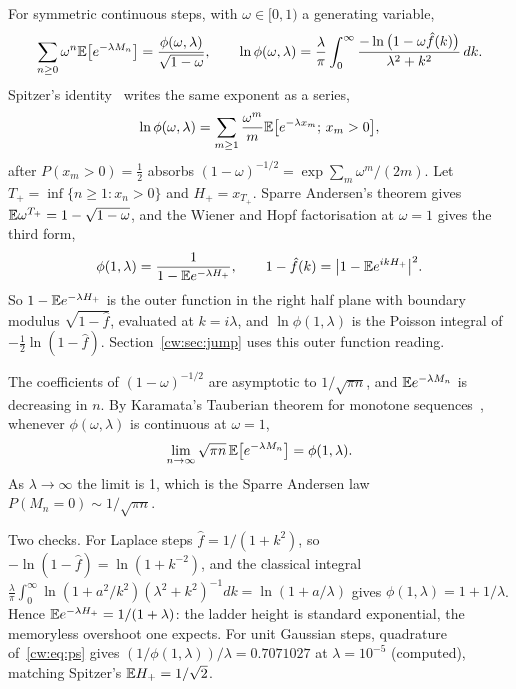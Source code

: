 For symmetric continuous steps, with $\omega\in[0,1)$ a generating variable,
\begin{equation}\label{cw:eq:ps}
\sum_{n\ge0}\omega^n\mathbb{E}\big[e^{-\lambda M_n}\big]=\frac{\phi(\omega,\lambda)}{\sqrt{1-\omega}},\qquad
\ln\phi(\omega,\lambda)=\frac\lambda\pi\int_0^\infty\frac{-\ln\big(1-\omega\hat f(k)\big)}{\lambda^2+k^2}\,dk .
\end{equation}
Spitzer's identity~\cite{Spitzer56} writes the same exponent as a series,
\begin{equation}\label{cw:eq:spitzer}
\ln\phi(\omega,\lambda)=\sum_{m\ge1}\frac{\omega^m}{m}\mathbb{E}\big[e^{-\lambda x_m};\,x_m>0\big],
\end{equation}
after $P(x_m>0)=\tfrac12$ absorbs $(1-\omega)^{-1/2}=\exp\sum_m\omega^m/(2m)$. Let $T_+=\inf\{n\ge1:x_n>0\}$ and $H_+=x_{T_+}$. Sparre Andersen's theorem gives $\mathbb{E}\omega^{T_+}=1-\sqrt{1-\omega}$, and the Wiener and Hopf factorisation at $\omega=1$ gives the third form,
\begin{equation}\label{cw:eq:ladder}
\phi(1,\lambda)=\frac{1}{1-\mathbb{E} e^{-\lambda H_+}},\qquad 1-\hat f(k)=\big|1-\mathbb{E} e^{ikH_+}\big|^2 .
\end{equation}
So $1-\mathbb{E} e^{-\lambda H_+}$ is the outer function in the right half plane with boundary modulus $\sqrt{1-\hat f}$, evaluated at $k=i\lambda$, and $\ln\phi(1,\lambda)$ is the Poisson integral of $-\frac12\ln(1-\hat f)$. Section~\ref{cw:sec:jump} uses this outer function reading.

The coefficients of $(1-\omega)^{-1/2}$ are asymptotic to $1/\sqrt{\pi n}$, and $\mathbb{E} e^{-\lambda M_n}$ is decreasing in $n$. By Karamata's Tauberian theorem for monotone sequences~\cite{BGT87}, whenever $\phi(\omega,\lambda)$ is continuous at $\omega=1$,
\begin{equation}\label{cw:eq:tauber}
\lim_{n\to\infty}\sqrt{\pi n}\,\mathbb{E}\big[e^{-\lambda M_n}\big]=\phi(1,\lambda).
\end{equation}
As $\lambda\to\infty$ the limit is 1, which is the Sparre Andersen law $P(M_n=0)\sim1/\sqrt{\pi n}$.

Two checks. For Laplace steps $\hat f=1/(1+k^2)$, so $-\ln(1-\hat f)=\ln(1+k^{-2})$, and the classical integral $\frac\lambda\pi\int_0^\infty\ln(1+a^2/k^2)(\lambda^2+k^2)^{-1}dk=\ln(1+a/\lambda)$ gives $\phi(1,\lambda)=1+1/\lambda$. Hence $\mathbb{E} e^{-\lambda H_+}=1/(1+\lambda)$: the ladder height is standard exponential, the memoryless overshoot one expects. For unit Gaussian steps, quadrature of~\eqref{cw:eq:ps} gives $(1/\phi(1,\lambda))/\lambda=0.7071027$ at $\lambda=10^{-5}$ (computed), matching Spitzer's $\mathbb{E} H_+=1/\sqrt2$.

